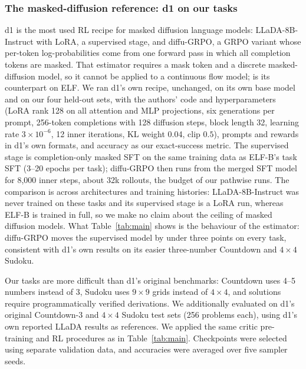 \subsubsection{The masked-diffusion reference: d1 on our tasks}
\label{app:d1}
d1 \citep{zhao2025d1} is the most used RL recipe for masked diffusion language models: LLaDA-8B-Instruct \citep{nie2025llada} with LoRA, a supervised stage, and diffu-GRPO, a GRPO variant whose per-token log-probabilities come from one forward pass in which all completion tokens are masked. That estimator requires a mask token and a discrete masked-diffusion model, so it cannot be applied to a continuous flow model; \methodGRPO{} is its counterpart on ELF. We ran d1's own recipe, unchanged, on its own base model and on our four held-out sets, with the authors' code and hyperparameters (LoRA rank 128 on all attention and MLP projections, six generations per prompt, 256-token completions with 128 diffusion steps, block length 32, learning rate $3\times10^{-6}$, 12 inner iterations, KL weight 0.04, clip $0.5$), prompts and rewards in d1's own formats, and accuracy as our exact-success metric. The supervised stage is completion-only masked SFT on the same training data as ELF-B's task SFT (3--20 epochs per task); diffu-GRPO then runs from the merged SFT model for 8{,}000 inner steps, about 32k rollouts, the budget of our pathwise runs. The comparison is across architectures and training histories: LLaDA-8B-Instruct was never trained on these tasks and its supervised stage is a LoRA run, whereas ELF-B is trained in full, so we make no claim about the ceiling of masked diffusion models. What Table~\ref{tab:main} shows is the behaviour of the estimator: diffu-GRPO moves the supervised model by under three points on every task, consistent with d1's own results on its easier three-number Countdown and $4{\times}4$ Sudoku.

\begingroup
\color{blue}
Our tasks are more difficult than d1's original benchmarks: Countdown uses 4--5 numbers instead of 3, Sudoku uses $9\times9$ grids instead of $4\times4$, and solutions require programmatically verified derivations. We additionally evaluated \method{} on d1's original Countdown-3 and $4\times4$ Sudoku test sets (256 problems each), using d1's own reported LLaDA results as references. We applied the same critic pre-training and RL procedures as in Table~\ref{tab:main}. Checkpoints were selected using separate validation data, and accuracies were averaged over five sampler seeds.

